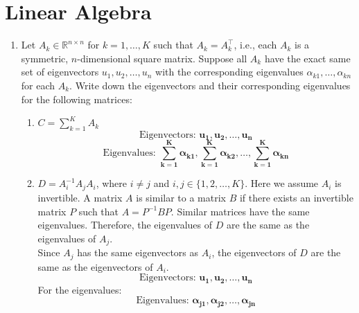 \documentclass[a3paper,12pt]{extarticle} %
\begin{document}
\section{Linear Algebra}
\begin{enumerate}
    \item Let \( A_k \in \mathbb{R}^{n \times n} \) for \( k = 1, \ldots, K \) such that \( A_k = A_k^\top \), i.e., each \( A_k \) is a symmetric, \( n \)-dimensional square matrix. Suppose all \( A_k \) have the exact same set of eigenvectors \( u_1, u_2, \ldots, u_n \) with the corresponding eigenvalues \( \alpha_{k1}, \ldots, \alpha_{kn} \) for each \( A_k \). Write down the eigenvectors and their corresponding eigenvalues for the following matrices:
    \begin{enumerate}
        \item \( C = \sum_{k=1}^K A_k \)
        \[
        \text{Eigenvectors: } \mathbf{u_1, u_2, \ldots, u_n}
        \]
        \[
        \text{Eigenvalues: } \mathbf{\sum_{k=1}^K \alpha_{k1}, \sum_{k=1}^K \alpha_{k2}, \ldots, \sum_{k=1}^K \alpha_{kn}}
        \]

        \item \( D = A_i^{-1} A_j A_i \), where \( i \neq j \) and \( i, j \in \{1, 2, \ldots, K\} \). Here we assume \( A_i \) is invertible.
        A matrix \(A\) is similar to a matrix \(B\) if there exists an invertible matrix \(P\) such that \(A = P^{-1}BP\). Similar matrices have the same eigenvalues. Therefore, the eigenvalues of \(D\) are the same as the eigenvalues of \(A_j\).
        \\ Since \(A_j\) has the same eigenvectors as \(A_i\), the eigenvectors of \(D\) are the same as the eigenvectors of \(A_i\).
        \[
        \text{Eigenvectors: } \mathbf{ u_1, u_2, \ldots, u_n}
        \]
        For the eigenvalues:
        \[
        \text{Eigenvalues: } \mathbf{ \alpha_{j1}, \alpha_{j2}, \ldots, \alpha_{jn}}
        \]
        
    \end{enumerate}
\end{enumerate}
\end{document}
